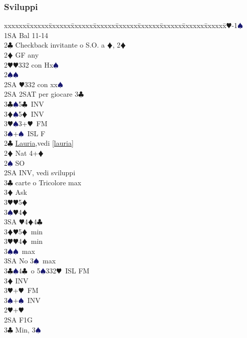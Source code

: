 \documentclass[a4paper,italian]{article}
\newcommand{\BC}{\textcolor{OliveGreen}{$\clubsuit$}}
\newcommand{\BD}{\textcolor{RedOrange}{$\vardiamondsuit$}}
\newcommand{\BH}{\textcolor{Red2}{$\varheartsuit${}}}
\newcommand{\BS}{\textcolor{MidnightBlue}{$\spadesuit${}}}
\newenvironment{bidtable}
{\begin{tabbing}

    xxxxxx\=xxxxxx\=xxxxxx\=xxxxxx\=xxxxxx\=xxxxxx\=xxxxxx\=xxxxxx\=xxxxxx\=xxxxxx\=\kill}
{\end{tabbing} }%
\begin{document}
\begin{multicols*}{2}
    \subsubsection{Sviluppi}

    \begin{bidtable}
        1\BH-1\BS\+\\
        1SA \> Bal 11-14\+\\
        2\BC \> Checkback invitante o S.O. a \BD , 2\BD \\
        2\BD \> GF any\+\\
        2\BH {}\BH 332 con Hx\BS \\
        2\BS {}\BS \\
        2SA \BH 332 con xx\BS \-\\
        2SA \> 2SAT per giocare 3\BC \\
        3\BC {}\BS 5\BC\ INV\\
        3\BD {}\BS 5\BD\ INV\\
        3\BH {}\BS 3+\BH\ FM\\
        3\BS {}+\BS\ ISL F\-\\
        2\BC \> \hyperref[lauria]{Lauria},vedi \ref{lauria}\\
        2\BD \> Nat 4+\BD\+\\
        2\BS \> SO\\
        2SA \> INV, vedi sviluppi\+\\
        3\BC {} carte o Tricolore max\+\\
        3\BD \> Ask\+\\
        3\BH {}\BH 5\BD \\
        3\BS {}\BH 4\BD \\
        3SA \BH 4\BD 4\BC \-\-\\
        3\BD {}\BH 5\BD\ min\\
        3\BH {}\BH 4\BD\ min\\
        3\BS {}\BS\ max\\
        3SA \> No 3\BS\ max\-\\
        3\BC {}\BS 4\BC\ o 5\BS 332\BH\ ISL FM\\
        3\BD \> INV\\
        3\BH {}+\BH\ FM\\
        3\BS {}+\BS\ INV\-\\
        2\BH {}+\BH \+\\
        2SA \> F1G\+\\
        3\BC \> Min, 3\BS\+\\

\end{bidtable}
\end{multicols*}
\end{document}
